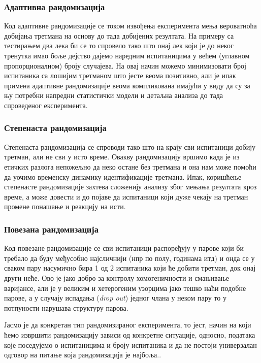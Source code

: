 \documentclass[12pt, a4paper]{article}
\begin{document}
\subsubsection{Адаптивна рандомизација}

Код адаптивне рандомизације се током извођења експеримента мења вероватноћа добијања третмана на 
основу до тада добијених резултата. На примеру са тестирањем два лека би се то спровело тако што 
онај лек који је до неког тренутка имао боље дејство дајемо наредним испитаницима у већем 
(углавном пропорционалном) броју случајева. На овај начин можемо минимизовати број испитаника са 
лошијим третманом што јесте веома позитивно, али је ипак примена адаптивне рандомизације веома 
компликована имајући у виду да су за њу потребни напредни статистички модели и детаљна анализа 
до тада спроведеног експеримента.

\subsubsection{Степенаста рандомизација}

Степенаста рандомизација се спроводи тако што на крају сви испитаници добију третман, али не сви 
у исто време. Овакву рандомизацију вршимо када је из етичких разлога непожељно да неко остане без 
третмана и она нам може помоћи да уочимо временску динамику идентификације третмана. 
Ипак, коришћење степенасте рандомизације захтева сложенију анализу због мењања резултата кроз 
време, а може довести и до појаве да испитаници који дуже чекају на третман промене понашање и 
реакцију на исти. 

\subsubsection{Повезана рандомизација}

Код повезане рандомизације се сви испитаници распоређују у парове који би требало да буду 
међусобно најсличнији (нпр по полу, годинама итд) и онда се у сваком пару насумично бира 1 од 2 
испитаника који ће добити третман, док онај други неће.
Ово је јако добро за контролу хомогеничности и смањивање варијансе, али је у великим и 
хетерогеним узорцима јако тешко наћи подобне парове, а у случају испадања (\textit{drop out}) 
једног члана у неком пару то у потпуности нарушава структуру парова. 

Јасмо је да конкретан тип рандомизираног експеримента, то јест, начин на који ћемо извршити 
рандомизацију зависи од конкретне ситуације, односно, података које поседујемо о испитаницима и 
броју испитаника и да не постоји универзалан одговор на питање која рандомизација је најбоља..
\end{document}
